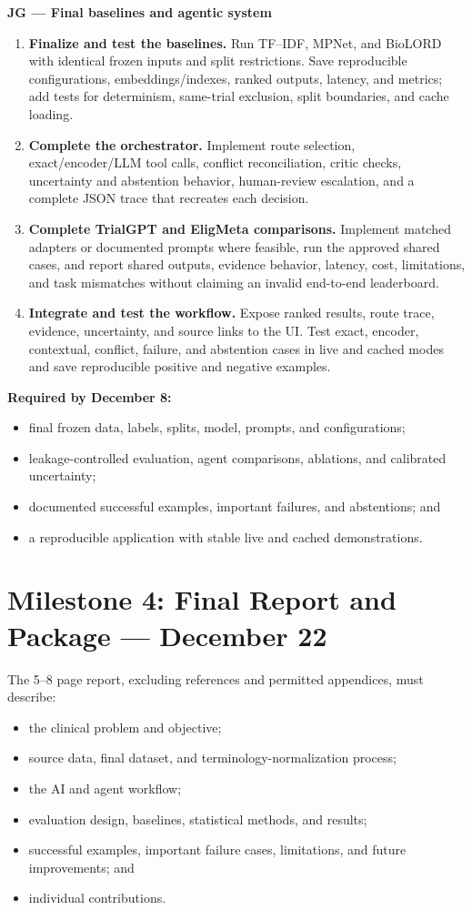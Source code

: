 \documentclass[10pt]{article}
\begin{document}
\textbf{JG --- Final baselines and agentic system}
\begin{enumerate}
\item \textbf{Finalize and test the baselines.} Run TF--IDF, MPNet, and BioLORD with identical frozen inputs and split restrictions. Save reproducible configurations, embeddings/indexes, ranked outputs, latency, and metrics; add tests for determinism, same-trial exclusion, split boundaries, and cache loading.
\item \textbf{Complete the orchestrator.} Implement route selection, exact/encoder/LLM tool calls, conflict reconciliation, critic checks, uncertainty and abstention behavior, human-review escalation, and a complete JSON trace that recreates each decision.
\item \textbf{Complete TrialGPT and EligMeta comparisons.} Implement matched adapters or documented prompts where feasible, run the approved shared cases, and report shared outputs, evidence behavior, latency, cost, limitations, and task mismatches without claiming an invalid end-to-end leaderboard.
\item \textbf{Integrate and test the workflow.} Expose ranked results, route trace, evidence, uncertainty, and source links to the UI. Test exact, encoder, contextual, conflict, failure, and abstention cases in live and cached modes and save reproducible positive and negative examples.
\end{enumerate}
\textbf{Required by December 8:}
\begin{itemize}
\item final frozen data, labels, splits, model, prompts, and configurations;
\item leakage-controlled evaluation, agent comparisons, ablations, and calibrated uncertainty;
\item documented successful examples, important failures, and abstentions; and
\item a reproducible application with stable live and cached demonstrations.
\end{itemize}

\section{Milestone 4: Final Report and Package --- December 22}
The 5--8 page report, excluding references and permitted appendices, must describe:
\begin{itemize}
\item the clinical problem and objective;
\item source data, final dataset, and terminology-normalization process;
\item the AI and agent workflow;
\item evaluation design, baselines, statistical methods, and results;
\item successful examples, important failure cases, limitations, and future improvements; and
\item individual contributions.
\end{itemize}
\end{document}
